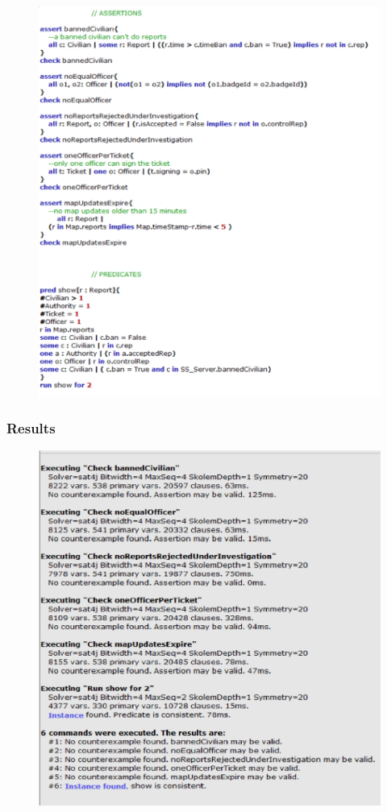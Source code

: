 \documentclass[12pt,a4paper]{article}
\begin{document}
\begin{figure}[H]
				\centering
				\includegraphics[width=.75\paperwidth,height=.75\paperheight, keepaspectratio]{Images/Alloy/asserts}
\end{figure}

\subsubsection{Results}
\begin{figure}[H]
				\centering
				\includegraphics[width=.6\paperwidth,height=.6\paperheight, keepaspectratio]{Images/Alloy/results}
\end{figure}
\end{document}
